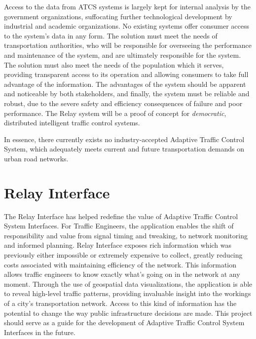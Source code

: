 \documentclass[a4paper,11pt]{article}
\begin{document}
\begin{multicols}{2}
Access to the data from ATCS systems is largely kept for internal analysis by the government organizations, suffocating further technological development by industrial and academic organizations.
No existing systems offer consumer access to the system's data in any form.
The solution must meet the needs of transportation authorities, who will be responsible for overseeing the performance and maintenance of the system, and are ultimately responsible for the system.
The solution must also meet the needs of the population which it serves, providing transparent access to its operation and allowing consumers to take full advantage of the information.
The advantages of the system should be apparent and noticeable by both stakeholders, and finally, the system must be reliable and robust, due to the severe safety and efficiency consequences of failure and poor performance. The Relay system will be a proof of concept for \emph{democratic}, distributed intelligent traffic control systems.

In essence, there currently exists no industry-accepted Adaptive Traffic Control System, which adequately meets current and future transportation demands on urban road networks.

\section{Relay Interface}



The Relay Interface has helped redefine the value of Adaptive Traffic Control System Interfaces. For Traffic Engineers, the application enables the shift of responsibility and value from signal timing and tweaking, to network monitoring and informed planning. Relay Interface exposes rich information which was previously either impossible or extremely expensive to collect, greatly reducing costs associated with maintaining efficiency of the network. This information allows traffic engineers to know exactly what's going on in the network at any moment. Through the use of geospatial data visualizations, the application is able to reveal high-level traffic patterns, providing invaluable insight into the workings of a city's transportation network. Access to this kind of information has the potential to change the way public infrastructure decisions are made. This project should serve as a guide for the development of Adaptive Traffic Control System Interfaces in the future.


\end{multicols}
\end{document}
